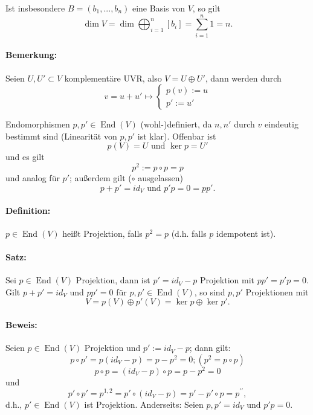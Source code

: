 	Ist insbesondere $ B=(b_1,...,b_n) $ eine Basis von $ V $, so gilt
		\begin{equation*}
		\dim V = \dim \bigoplus_{i=1}^n [b_i]=\sum_{i=1}^{n}1 = n.
		\end{equation*}
\paragraph{Bemerkung: }
	Seien $ U,U'\subset V $ komplementäre UVR, also $ V = U \oplus U' $, dann werden durch
		\begin{equation*}
		v = u+u' \mapsto
			\begin{cases}
			p(v):=u\\
			p':= u'
			\end{cases}
		\end{equation*}
	
	Endomorphismen $ p,p'\in \operatorname{End}(V) $ (wohl-)definiert, da $ n,n' $ durch $ v $ eindeutig bestimmt sind (Linearität von $ p,p' $ ist klar).
	Offenbar ist 
		\[ p(V) = U \text{ und } \ker p = U'\]
	und es gilt
		\[ p^2 := p\circ p = p \]
	und analog für $ p' $; außerdem gilt ($ \circ $ ausgelassen)
		\[ p+p' = id_V \text{ und } p'p = 0 = pp'.\]
		
\paragraph{Definition: }
	$ p\in \operatorname{End}(V) $ heißt Projektion, falls $ p^2 = p $ (d.h. falls $ p $ idempotent ist).
	
\paragraph{Satz: }
	Sei $ p\in \operatorname{End}(V) $ Projektion, dann ist $ p'= id_V-p $ Projektion mit $ pp' = p'p = 0 $. Gilt $ p+p' = id_V $ und $ pp' = 0 $ für $ p,p' \in \operatorname{End}(V) $, so sind $ p,p' $ Projektionen mit
		\[ V = p(V)\oplus p'(V) = \ker p \oplus \ker p'. \]
		
\paragraph{Beweis: }
	Seien $p\in \operatorname{End}(V)$ Projektion und $p' := id_V -p$; dann gilt:
		\[p\circ p' = p(id_V-p)=p-p^{2} = 0; (p^{2} = p\circ p)\]
		\[p\circ p = (id_V-p)\circ p = p - p^{2} = 0\]
	und
		\[p' \circ p' = p^{1,2}=p' \circ(id_V-p)=p'-p'\circ p = p^{\prime\prime},\]
	d.h., $p'\in\operatorname{End}(V)$ ist Projektion.
	Anderseits: Seien $p,p' = id_V \text{ und } p' p = 0$.
		
